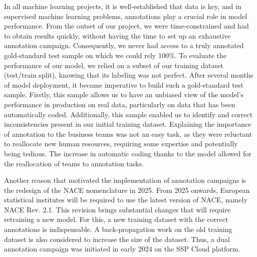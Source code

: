 In all machine learning projects, it is well-established that data is key, and in supervised machine learning problems, annotations play a crucial role in model performance. From the outset of our project, we were time-constrained and had to obtain results quickly, without having the time to set up an exhaustive annotation campaign. Consequently, we never had access to a truly annotated gold-standard test sample on which we could rely 100\%. To evaluate the performance of our model, we relied on a subset of our training dataset (test/train split), knowing that its labeling was not perfect. After several months of model deployment, it became imperative to build such a gold-standard test sample. Firstly, this sample allows us to have an unbiased view of the model's performance in production on real data, particularly on data that has been automatically coded. Additionally, this sample enabled us to identify and correct inconsistencies present in our initial training dataset. Explaining the importance of annotation to the business teams was not an easy task, as they were reluctant to reallocate new human resources, requiring some expertise and potentially being tedious. The increase in automatic coding thanks to the model allowed for the reallocation of teams to annotation tasks.

Another reason that motivated the implementation of annotation campaigns is the redesign of the NACE nomenclature in 2025. From 2025 onwards, European statistical institutes will be required to use the latest version of NACE, namely NACE Rev. 2.1. This revision brings substantial changes that will require retraining a new model. For this, a new training dataset with the correct annotations is indispensable. A back-propagation work on the old training dataset is also considered to increase the size of the dataset. Thus, a dual annotation campaign was initiated in early 2024 on the SSP Cloud platform.

